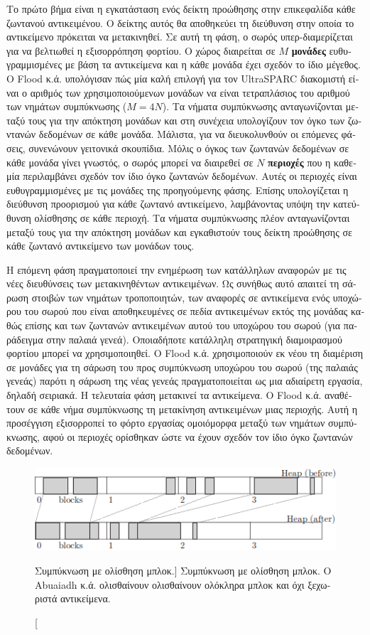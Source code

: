 \begin{greek}
Το πρώτο βήμα είναι η εγκατάσταση ενός δείκτη προώθησης στην
επικεφαλίδα κάθε ζωντανού αντικειμένου. Ο δείκτης αυτός θα
αποθηκεύει τη διεύθυνση στην οποία το αντικείμενο πρόκειται
να μετακινηθεί. Σε αυτή τη φάση, ο σωρός υπερ-διαμερίζεται
για να βελτιωθεί η εξισορρόπηση φορτίου. Ο χώρος διαιρείται
σε $M$ \textbf{μονάδες} ευθυγραμμισμένες με βάση τα αντικείμενα
και η κάθε μονάδα έχει σχεδόν το ίδιο μέγεθος. Ο Flood κ.ά. υπολόγισαν
πώς μία καλή επιλογή για τον UltraSPARC διακομιστή είναι ο
αριθμός των χρησιμοποιούμενων μονάδων να είναι τετραπλάσιος
του αριθμού των νημάτων συμπύκνωσης ($M=4N$). Τα νήματα συμπύκνωσης
ανταγωνίζονται μεταξύ τους για την απόκτηση μονάδων και στη
συνέχεια υπολογίζουν τον όγκο των ζωντανών δεδομένων σε κάθε
μονάδα. Μάλιστα, για να διευκολυνθούν οι επόμενες φάσεις,
συνενώνουν γειτονικά σκουπίδια. Μόλις ο όγκος των ζωντανών
δεδομένων σε κάθε μονάδα γίνει γνωστός, ο σωρός μπορεί να 
διαιρεθεί σε $N$ \textbf{περιοχές} που η καθεμία περιλαμβάνει
σχεδόν τον ίδιο όγκο ζωντανών δεδομένων. Αυτές οι περιοχές
είναι ευθυγραμμισμένες με τις μονάδες της προηγούμενης φάσης.
Επίσης υπολογίζεται η διεύθυνση προορισμού για κάθε ζωντανό
αντικείμενο, λαμβάνοντας υπόψη την κατεύθυνση ολίσθησης σε
κάθε περιοχή. Τα νήματα συμπύκνωσης πλέον ανταγωνίζονται μεταξύ
τους για την απόκτηση μονάδων και εγκαθιστούν τους δείκτη προώθησης
σε κάθε ζωντανό αντικείμενο των μονάδων τους.

Η επόμενη φάση πραγματοποιεί την ενημέρωση των κατάλληλων αναφορών
με τις νέες διευθύνσεις των μετακινηθέντων αντικειμένων. Ως
συνήθως αυτό απαιτεί τη σάρωση στοιβών των νημάτων τροποποιητών,
των αναφορές σε αντικείμενα ενός υποχώρου του σωρού που είναι
αποθηκευμένες σε πεδία αντικειμένων εκτός της μονάδας καθώς
επίσης και των ζωντανών αντικειμένων αυτού του υποχώρου του
σωρού (για παράδειγμα στην παλαιά γενεά). Οποιαδήποτε κατάλληλη
στρατηγική διαμοιρασμού φορτίου μπορεί να χρησιμοποιηθεί. Ο
Flood κ.ά. χρησιμοποιούν εκ νέου τη διαμέριση σε μονάδες για
τη σάρωση του προς συμπύκνωση υποχώρου του σωρού (της παλαιάς
γενεάς) παρότι η σάρωση της νέας γενεάς πραγματοποιείται ως
μια αδιαίρετη εργασία, δηλαδή σειριακά. Η τελευταία φάση μετακινεί
τα αντικείμενα. Ο Flood κ.ά. αναθέτουν σε κάθε νήμα συμπύκνωσης
τη μετακίνηση αντικειμένων μιας περιοχής. Αυτή η προσέγγιση
εξισορροπεί το φόρτο εργασίας ομοιόμορφα μεταξύ των νημάτων
συμπύκνωσης, αφού οι περιοχές ορίσθηκαν ώστε να έχουν σχεδόν
τον ίδιο όγκο ζωντανών δεδομένων.

\begin{figure}[H]
  \centering
  \includegraphics{figures/par_6}
  \caption
    [Συμπύκνωση με ολίσθηση μπλοκ.]
    {Συμπύκνωση με ολίσθηση μπλοκ. Ο Abuaiadh κ.ά. ολισθαίνουν
     ολισθαίνουν ολόκληρα μπλοκ και όχι ξεχωριστά αντικείμενα.}
  \label{fig:par_6}
\end{figure}


\end{greek}
